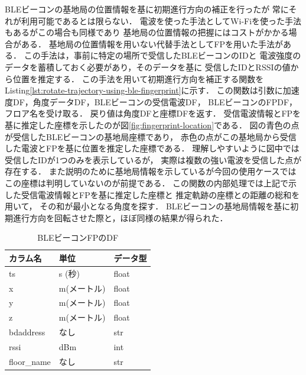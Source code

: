 BLEビーコンの基地局の位置情報を基に初期進行方向の補正を行ったが
常にそれが利用可能であるとは限らない．
電波を使った手法としてWi-Fiを使った手法もあるがこの場合も同様であり
基地局の位置情報の把握にはコストがかかる場合がある．
基地局の位置情報を用いない代替手法としてFPを用いた手法がある．
この手法は，事前に特定の場所で受信したBLEビーコンのIDと
電波強度のデータを蓄積しておく必要があり，そのデータを基に
受信したIDとRSSIの値から位置を推定する．
この手法を用いて初期進行方向を補正する関数を
Listing\ref{lst:rotate-trajectory-using-ble-fingerprint}に示す．
この関数は引数に加速度DF，角度データDF，BLEビーコンの受信電波DF，
BLEビーコンのFPDF，フロア名を受け取る．
戻り値は角度DFと座標DFを返す．
受信電波情報とFPを基に推定した座標を示したのが図\ref{fig:fingerprint-location}である．
図の青色の点が受信したBLEビーコンの基地局座標であり，
赤色の点がこの基地局から受信した電波とFPを基に位置を推定した座標である．
理解しやすいように図中では受信したIDが1つのみを表示しているが，
実際は複数の強い電波を受信した点が存在する．
また説明のために基地局情報を示しているが今回の使用ケースでは
この座標は判明していないのが前提である．
この関数の内部処理では上記で示した受信電波情報とFPを基に推定した座標と
推定軌跡の座標との距離の総和を用いて，
その和が最小となる角度を探す．
BLEビーコンの基地局情報を基に初期進行方向を回転させた際と，ほぼ同様の結果が得られた．


\begin{table}[ht]
	\centering
	\begin{tabular}{lll}
		\toprule
		カラム名        & 単位      & データ型  \\
		\midrule
		ts          & s (秒)   & float \\
		x           & m(メートル) & float \\
		y           & m(メートル) & float \\
		z           & m(メートル) & float \\
		bdaddress   & なし      & str   \\
		rssi        & dBm     & int   \\
		floor\_name & なし      & str   \\
		\bottomrule
	\end{tabular}
	\caption{BLEビーコンFPのDF}
	\label{table:ble-beacon-fingerprint-df}
\end{table}



